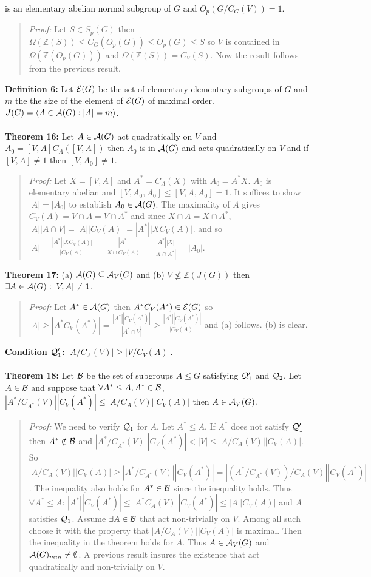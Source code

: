 is an elementary
abelian normal subgroup of $G$ and $O_p(G/C_G(V))=1$.
\begin{quote}
\emph{Proof:}  
Let $S \in S_p(G)$ then $\Omega ({\mathbb Z}(S)) \le C_G(O_p(G)) \le O_p(G) \le S$ so
$V$ is contained in $\Omega({\mathbb Z}(O_p(G)))$ and $\Omega({\mathbb Z}(S))= C_V(S)$.  
Now the result follows from the previous result.
\end{quote}
{\bf Definition 6:} Let ${\cal E}(G)$ be the set of elementary elementary subgroups of $G$ and
$m$ the the size of the element of ${\cal E}(G)$ of maximal order.
$J(G)= \langle A \in {\cal A}(G): |A|=m \rangle $.
\\
\\
{\bf Theorem 16:}
Let $A \in {\cal A}(G)$ act quadratically
on $V$ and $A_0 = [V,A] C_A([V,A])$ then $A_0$ is in ${\cal A}(G)$ and acts quadratically
on $V$ and if $[V,A] \ne 1$ then $[V, A_0 ] \ne 1$.
\begin{quote}
\emph{Proof:}  
Let $X= [V,A]$ and $A^*= C_A(X)$ with $A_0= A^*X$.  $A_0$ is elementary abelian
and $[V,A_0, A_0] \le [V, A, A_0 ] =1$.  It suffices to show $|A|= |A_0|$ to establish
$A_0 \in {\cal A}(G)$.  The maximality of $A$ gives $C_V(A)= V \cap A= V \cap A^*$ and since 
$X \cap A = X \cap A^*$, $|A| |A \cap V| = |A| |C_V(A)| = |A^*| |XC_V(A)|$.
and so
$|A| = {\frac {|A^*| |XC_V(A)|} {|C_V(A)|}} =
{\frac {|A^*|} {|X \cap C_V(A)|}} = {\frac {|A^*| |X|} {|X \cap A^*|}} = |A_0|$.
\end{quote}
{\bf Theorem 17:} 
(a) ${\cal A}(G) \subseteq {\cal A}_V(G)$ and (b) $V \nleq {\mathbb Z}(J(G))$ then
$\exists A \in {\cal A}(G): [V,A] \ne 1$.
\begin{quote}
\emph{Proof:}  
Let $ A^* \in {\cal A}(G)$ then $A^* C_V(A^*) \in {\cal E}(G)$ so
$|A| \ge |A^* C_V(A^*)|=
{\frac {|A^*| |C_V(A^*)|} {|A^* \cap V|}} \ge
{\frac {|A^*| |C_V(A^*)|} {|C_V(A)|}} $ and (a) follows.  (b) is clear.
\end{quote}
{\bf Condition ${\cal Q}_1'$:} $|A/C_A(V)| \ge |V/C_V(A)|$.
\\
\\
{\bf Theorem 18:} 
Let ${\cal B}$ be the set of subgroups $A \le G$ satisfying 
${\cal Q}_1'$ and
${\cal Q}_2$.  Let $A \in {\cal B}$ and suppose that $\forall A^* \le A, A^* \in {\cal B}$,
$|A^*/C_{A^*}(V)| |C_V(A^*)| \le |A/C_A(V)| |C_V(A)|$ then $A \in {\cal A}_V(G)$.
\begin{quote}
\emph{Proof:}  
We need to verify ${\cal Q}_1$ for $A$.  Let $A^* \le A$.  If $A^*$ does not satisfy
${\cal Q}_1'$ then $A^* \notin {\cal B}$ and
$|A^*/C_{A^*}(V)| |C_V(A^*)| <
|V| \le |A/C_A(V)| |C_V(A)| $.  So 
$|A/C_A(V)| |C_V(A)| \ge |A^*/C_{A^*}(V)| |C_V(A^*)|=
|(A^*/C_{A^*}(V))/C_A(V)| |C_V(A^*)|$.  The inequality also holds for $A^* \in {\cal B}$ since
the inequality holds.
Thus $\forall A^* \le A$: 
$|A^*| |C_V(A^*)| \le |A^* C_{A}(V)| |C_V(A^*)| \le |A| |C_V(A)|$ and
$A$ satisfies ${\cal Q}_1$.
Assume $\exists A \in {\cal B}$ that act non-trivially on $V$.
Among all such choose it with the property that $|A/C_A(V)| |C_V(A)|$ is
maximal. Then the inequality in the theorem holds for $A$.  Thus
$A \in {\cal A}_V(G)$ and ${\cal A}(G)_{min} \ne \emptyset$.  A previous result insures
the existence that act quadratically and non-trivially on $V$.
\end{quote}
